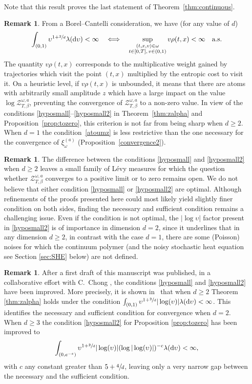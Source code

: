 \documentclass[JEP,XML,SOM,Unicode,published]{cedram}
\let\mathcal\mathscr
\theoremstyle{definition}
\newtheorem{rem}[theorem]{Remark}
\newcommand{\dd}{\mathrm{d}}
\newcommand{\cZ}{{\ensuremath{\mathcal Z}} }
\newcommand{\suptwo}[2]{\sup_{\substack{#1 \\ #2}}}
\let\gl\lambda
\let\ups\upsilon
\let\go\omega
\begin{document}
Note that this result proves the last statement of Theorem~\ref{thm:continuous}.

\begin{rem}
From a Borel--Cantelli consideration, we have (for any value of $d$)
\begin{equation}\label{atoumz}
\int_{(0,1)} \ups^{1+\sfrac{2}{d}} \gl(\dd \ups)<\infty \quad \Longleftrightarrow \quad
\suptwo{(t,x,v)\in \go}{ t\in [0,T],\, v\in(0,1)} v\rho(t,x)<\infty \quad \text{a.s.}
\end{equation}
The quantity $v\rho(t,x)$ corresponds to the multiplicative weight gained by trajectories which visit the point
$(t,x)$ multiplied by the entropic cost to visit it.
On a heuristic level, if $v\rho(t,x)$ is unbounded, it means that there are atoms with arbitrarily small amplitude $z$ which have a large impact on the value $\log \cZ^{\go,a}_{T,\beta}$, preventing the convergence of $\cZ^{\go,a}_{T,\beta}$ to a non-zero value.
In view of the conditions \eqref{hyposmall}--\eqref{hyposmall2} in
Theorem~\ref{thm:zalpha} and Proposition~\ref{prop:tozero}, this criterion is not far from being sharp when $d\ge 2$.
When $d=1$ the condition~\eqref{atoumz} is less restrictive than the one necessary for the convergence of $\xi^{(a)}_{\go}$ (\cf Proposition~\ref{convergence2}).
\end{rem}

\begin{rem}
The difference between the conditions \eqref{hyposmall} and \eqref{hyposmall2} when $d\ge 2$ leaves a small family of Lévy measures for which the question whether $\cZ^{\go,a}_{T,\beta}$ converges to a positive limit or to zero remains open. We do not believe that either condition \eqref{hyposmall} or \eqref{hyposmall2} are optimal. Although refinements of the proofs presented here could most likely yield slightly finer condition on both sides, finding the necessary and sufficient condition remains a challenging issue.
Even if the condition is not optimal, the $|\log \ups|$ factor present in \eqref{hyposmall2}
is of importance in dimension $d=2$, since it underlines that in any dimension $d\geq 2$, in contrast with the case $d=1$, there are some (Poisson) noises for which the continuum polymer (and the noisy stochastic heat equation see Section \ref{sec:SHE} below) are not defined.
\end{rem}

\begin{rem}
After a first draft of this manuscript was published, in a collaborative effort with C.\ Chong \cite{BCL21}, the conditions \eqref{hyposmall} and
\eqref{hyposmall2} have been improved. More precisely,
it is shown in~\cite{BCL21} that when $d\ge 2$
Theorem \ref{thm:zalpha} holds under the condition
$\int_{(0,1)} \ups^{1+\sfrac{2}{d}}|\log (\ups)| \gl(\dd \ups)<\infty$.
This identifies the necessary and sufficient condition for convergence when $d=2$. When $d\ge 3$ the condition \eqref{hyposmall2} for Proposition \ref{prop:tozero} has been improved to
\[
\int_{(0,e^{-e})} \ups^{1+\sfrac{2}{d}}|\log (\ups)| (\log |\log (\ups)|)^{-c}\gl(\dd \ups)<\infty,
\]
with $c$ any constant greater than $5+\sfrac4d$,
leaving only a very narrow gap between the necessary and the sufficient condition.
\end{rem}
\end{document}
